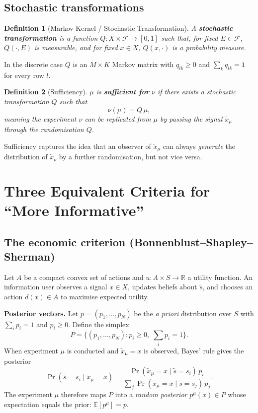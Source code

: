 \documentclass[12pt]{article}
\newtheorem{definition}{Definition}
\begin{document}
\subsection{Stochastic transformations}

\begin{definition}[Markov Kernel / Stochastic Transformation]
A \textbf{stochastic transformation} is a function $Q: X \times \mathscr{F}
\to [0,1]$ such that, for fixed $E \in \mathscr{F}$, $Q(\cdot, E)$ is
measurable, and for fixed $x \in X$, $Q(x, \cdot)$ is a probability measure.
\end{definition}

In the discrete case $Q$ is an $M \times K$ Markov matrix with
$q_{lk} \geq 0$ and $\sum_{k} q_{lk} = 1$ for every row $l$.

\begin{definition}[Sufficiency]
$\mu$ is \textbf{sufficient for} $\nu$ if there exists a stochastic
transformation $Q$ such that
\[
\nu(\mu) = Q\,\mu,
\]
meaning the experiment $\nu$ can be replicated from $\mu$ by passing the
signal $\tilde{x}_\mu$ through the randomisation $Q$.
\end{definition}

Sufficiency captures the idea that an observer of $\tilde{x}_\mu$ can
always \emph{generate} the distribution of $\tilde{x}_\nu$ by a further
randomisation, but not vice versa.

\section{Three Equivalent Criteria for ``More Informative''}

\subsection{The economic criterion (Bonnenblust--Shapley--Sherman)}

Let $A$ be a compact convex set of actions and $u: A \times S \to \mathbb{R}$
a utility function.  An information user observes a signal $x \in X$, updates
beliefs about $\tilde{s}$, and chooses an action $d(x) \in A$ to maximise
expected utility.

\medskip
\noindent\textbf{Posterior vectors.}  Let $p = (p_1, \ldots, p_N)$ be the
\emph{a priori} distribution over $S$ with $\sum_i p_i = 1$ and $p_i \geq 0$.
Define the simplex
\[
P = \bigl\{(p_1, \ldots, p_N) : p_i \geq 0,\; \textstyle\sum_i p_i = 1\bigr\}.
\]
When experiment $\mu$ is conducted and $\tilde{x}_\mu = x$ is observed, Bayes'
rule gives the posterior
\[
\Pr(\tilde{s} = s_i \mid \tilde{x}_\mu = x)
= \frac{\Pr(\tilde{x}_\mu = x \mid \tilde{s} = s_i)\, p_i}
       {\sum_j \Pr(\tilde{x}_\mu = x \mid \tilde{s} = s_j)\, p_j}.
\]
The experiment $\mu$ therefore maps $P$ into a \emph{random posterior}
$p^{\mu}(x) \in P$ whose expectation equals the prior:
$\mathbb{E}[p^{\mu}] = p$.
\end{document}
